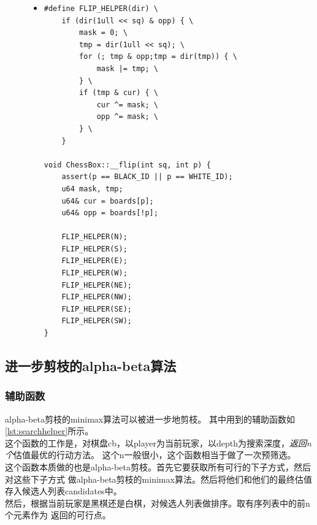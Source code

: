 \documentclass[a4paper]{article}
\begin{document}
\begin{figure}[!hbt]
\begin{itemize}
\item[] \begin{lstlisting}[style=mycpp, label=lst:reverte, caption=二进制棋盘的翻转实现]
#define FLIP_HELPER(dir) \
    if (dir(1ull << sq) & opp) { \
        mask = 0; \
        tmp = dir(1ull << sq); \
        for (; tmp & opp;tmp = dir(tmp)) { \
            mask |= tmp; \
        } \
        if (tmp & cur) { \
            cur ^= mask; \
            opp ^= mask; \
        } \
    }

void ChessBox::__flip(int sq, int p) {
    assert(p == BLACK_ID || p == WHITE_ID);
    u64 mask, tmp;
    u64& cur = boards[p];
    u64& opp = boards[!p];

    FLIP_HELPER(N);
    FLIP_HELPER(S);
    FLIP_HELPER(E);
    FLIP_HELPER(W);
    FLIP_HELPER(NE);
    FLIP_HELPER(NW);
    FLIP_HELPER(SE);
    FLIP_HELPER(SW);
}
\end{lstlisting}
\end{itemize}
\end{figure}

\subsection{进一步剪枝的alpha-beta算法}
\subsubsection{辅助函数}\label{subsec:ab-trunc-helper}
alpha-beta剪枝的minimax算法可以被进一步地剪枝。
其中用到的辅助函数如\autoref{lst:searchhelper}所示。\\

这个函数的工作是，对棋盘cb，以player为当前玩家，以depth为搜索深度，\emph{返回n个}估值最优的行动方法。
这个n一般很小，这个函数相当于做了一次预筛选。\\

这个函数本质做的也是alpha-beta剪枝。首先它要获取所有可行的下子方式，然后对这些下子方式
做alpha-beta剪枝的minimax算法。然后将他们和他们的最终估值存入候选人列表candidates中。\\

然后，根据当前玩家是黑棋还是白棋，对候选人列表做排序。取有序列表中的前n个元素作为
返回的可行点。\\
\end{document}

